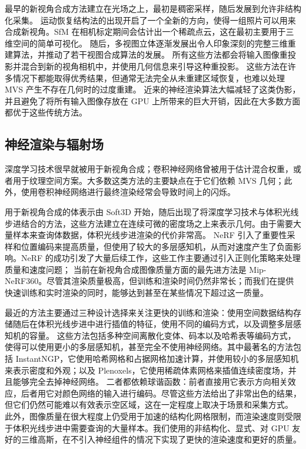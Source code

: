 最早的新视角合成方法建立在光场之上，最初是稠密采样，随后发展到允许非结构化采集。
运动恢复结构法的出现开启了一个全新的方向，使得一组照片可以用来合成新视角。SfM 在相机标定期间会估计出一个稀疏点云，这在最初主要用于三维空间的简单可视化。
随后，多视图立体逐渐发展出令人印象深刻的完整三维重建算法，并推动了若干视图合成算法的发展。
所有这些方法都会将输入图像重投影并混合到新的视角相机中，并使用几何信息来引导这种重投影。
这些方法在许多情况下都能取得优秀结果，但通常无法完全从未重建区域恢复，也难以处理 MVS 产生不存在几何时的过度重建。
近来的神经渲染算法大幅减轻了这类伪影，并且避免了将所有输入图像存放在 GPU 上所带来的巨大开销，因此在大多数方面都优于这些传统方法。

\subsection{神经渲染与辐射场}

深度学习技术很早就被用于新视角合成；卷积神经网络曾被用于估计混合权重，或者用于纹理空间方案。大多数这类方法的主要缺点在于它们依赖 MVS 几何；此外，使用卷积神经网络进行最终渲染经常会导致时间上的闪烁。

用于新视角合成的体表示由 Soft3D 开始，随后出现了将深度学习技术与体积光线步进结合的方法，这些方法建立在连续可微的密度场之上来表示几何。由于需要大量样本来查询体数据，体积光线步进渲染的代价非常高。
NeRF 引入了重要性采样和位置编码来提高质量，但使用了较大的多层感知机，从而对速度产生了负面影响。NeRF 的成功引发了大量后续工作，这些工作主要通过引入正则化策略来处理质量和速度问题；
当前在新视角合成图像质量方面的最先进方法是 Mip-NeRF360。尽管其渲染质量极高，但训练和渲染时间仍然非常长；而我们在提供快速训练和实时渲染的同时，能够达到甚至在某些情况下超过这一质量。

最近的方法主要通过三种设计选择来关注更快的训练和渲染：使用空间数据结构存储随后在体积光线步进中进行插值的特征，使用不同的编码方式，以及调整多层感知机的容量。
这些方法包括多种空间离散化变体、码本以及哈希表等编码方式，使得可以使用更小的多层感知机，甚至完全不使用神经网络。其中最著名的方法包括 InstantNGP，它使用哈希网格和占据网格加速计算，并使用较小的多层感知机来表示密度和外观；以及 Plenoxels，它使用稀疏体素网格来插值连续密度场，并且能够完全去掉神经网络。
二者都依赖球谐函数：前者直接用它表示方向相关效应，后者用它对颜色网络的输入进行编码。尽管这些方法给出了非常出色的结果，但它们仍然可能难以有效表示空区域，这在一定程度上取决于场景和采集方式。
此外，图像质量在很大程度上仍受用于加速的结构化网格限制，而渲染速度则受限于体积光线步进中需要查询的大量样本。我们使用的非结构化、显式、对 GPU 友好的三维高斯，在不引入神经组件的情况下实现了更快的渲染速度和更好的质量。

